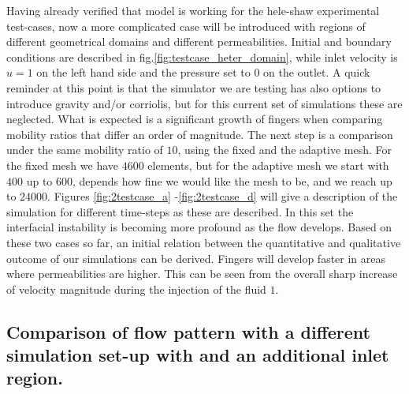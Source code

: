 \documentclass[preprint,authoryear,12pt]{elsarticle}
\begin{document}
\medskip
Having already verified that model is working for the hele-shaw experimental test-cases, now a more complicated case will be introduced with regions of different geometrical domains and different permeabilities. Initial and boundary conditions are described in fig.\ref{fig:testcase_heter_domain}, while inlet velocity is $u=1$ on the left hand side and the pressure set to $0$ on the outlet. A quick reminder at this point is that the simulator we are testing has also options to introduce gravity and/or corriolis, but for this current set of simulations these are neglected. What is expected is a significant growth of fingers when comparing mobility ratios that differ an order of magnitude. %
The next step is a comparison under the same mobility ratio of $10$, using the fixed and the adaptive mesh. For the fixed mesh we have $4600$ elements, but for the adaptive mesh we start with $400$ up to $600$, depends how fine we would like the mesh to be, and we reach up to $24000$. %
Figures \ref{fig:2testcase_a}%
-\ref{fig:2testcase_d} will give a description of the simulation for different time-steps as these are described. In this set the interfacial instability is becoming more profound as the flow develops. Based on these two cases so far, an initial relation between the quantitative and qualitative outcome of our simulations can be derived. Fingers will develop faster in areas where permeabilities are higher. This can be seen from the overall sharp increase of velocity magnitude during the injection of the fluid $1$.    


\subsection{Comparison of flow pattern with a different simulation set-up with and an additional inlet region.}\label{section:results_dinlet}
\end{document}
